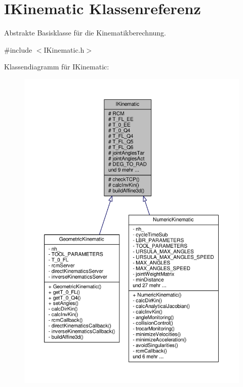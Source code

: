 \hypertarget{classIKinematic}{\section{I\-Kinematic Klassenreferenz}
\label{classIKinematic}
}


Abstrakte Basisklasse für die Kinematikberechnung.  




{\ttfamily \#include $<$I\-Kinematic.\-h$>$}



Klassendiagramm für I\-Kinematic\-:
\nopagebreak
\begin{figure}[H]
\begin{center}
\leavevmode
\includegraphics[width=350pt]{classIKinematic__inherit__graph}
\end{center}
\end{figure}


